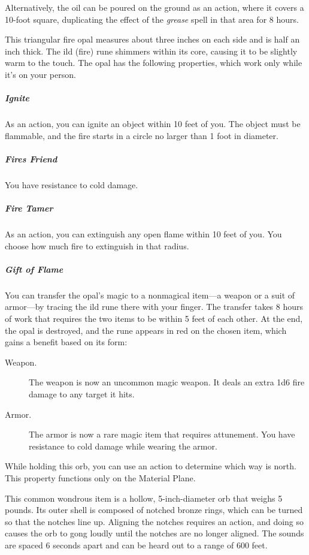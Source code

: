\documentclass[10pt,a4paper,twoside,bg=print,twocolumn,openany,nodeprecatedcode]{dndbook}
\begin{document}
Alternatively, the oil can be poured on the ground as an action, where it covers a 10-foot square, duplicating the effect of the \textit{grease} spell in that area for 8 hours.

This triangular fire opal measures about three inches on each side and is half an inch thick. The ild (fire) rune shimmers within its core, causing it to be slightly warm to the touch. The opal has the following properties, which work only while it's on your person.

\subparagraph{Ignite}
As an action, you can ignite an object within 10 feet of you. The object must be flammable, and the fire starts in a circle no larger than 1 foot in diameter.

\subparagraph{Fires Friend}
You have resistance to cold damage.

\subparagraph{Fire Tamer}
As an action, you can extinguish any open flame within 10 feet of you. You choose how much fire to extinguish in that radius.

\subparagraph{Gift of Flame}
You can transfer the opal's magic to a nonmagical item—a weapon or a suit of armor—by tracing the ild rune there with your finger. The transfer takes 8 hours of work that requires the two items to be within 5 feet of each other. At the end, the opal is destroyed, and the rune appears in red on the chosen item, which gains a benefit based on its form:


\begin{description}
\item[Weapon.]
The weapon is now an uncommon magic weapon. It deals an extra 1d6 fire damage to any target it hits.
\item[Armor.]
The armor is now a rare magic item that requires attunement. You have resistance to cold damage while wearing the armor.
\end{description}

While holding this orb, you can use an action to determine which way is north. This property functions only on the Material Plane.

This common wondrous item is a hollow, 5-inch-diameter orb that weighs 5 pounds. Its outer shell is composed of notched bronze rings, which can be turned so that the notches line up. Aligning the notches requires an action, and doing so causes the orb to gong loudly until the notches are no longer aligned. The sounds are spaced 6 seconds apart and can be heard out to a range of 600 feet.
\end{document}
